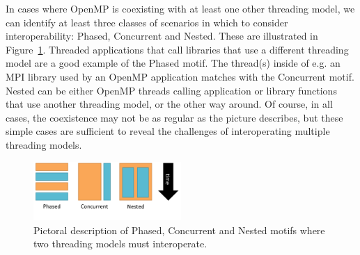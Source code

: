 In cases where OpenMP is coexisting with at least one other threading model,
we can identify at least three classes of scenarios in which to consider
interoperability: Phased, Concurrent and Nested.
These are illustrated in Figure~\ref{fig:interop-motif}.
Threaded applications that call libraries that use a different threading model
are a good example of the Phased motif.
The thread(s) inside of e.g. an MPI library used by an OpenMP application
matches with the Concurrent motif.
Nested can be either OpenMP threads calling application or library
functions that use another threading model, or the other way around.
Of course, in all cases, the coexistence may not be as regular as
the picture describes, but these simple cases are sufficient to reveal
the challenges of interoperating multiple threading models.
\begin{figure}[htb]
\centering
\includegraphics[width=0.5\textwidth]{images/interop-motifs}
\caption{Pictoral description of Phased, Concurrent and Nested
motifs where two threading models must interoperate.
\label{fig:interop-motif}
}
\end{figure}

